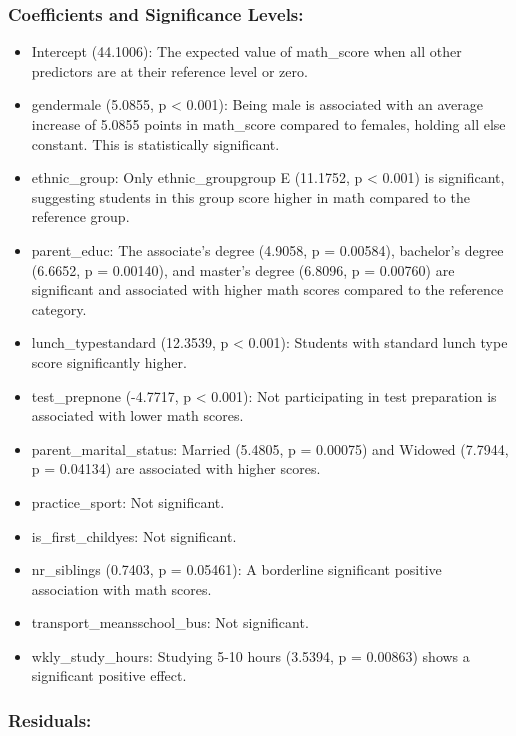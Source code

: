 \documentclass[
  12pt,
]{article}
\providecommand{\tightlist}{%
  \setlength{\itemsep}{0pt}\setlength{\parskip}{0pt}}
\begin{document}
\hypertarget{coefficients-and-significance-levels}{%
\subsubsection{Coefficients and Significance
Levels:}\label{coefficients-and-significance-levels}}

\begin{itemize}
\tightlist
\item
  Intercept (44.1006): The expected value of math\_score when all other
  predictors are at their reference level or zero.
\item
  gendermale (5.0855, p \textless{} 0.001): Being male is associated
  with an average increase of 5.0855 points in math\_score compared to
  females, holding all else constant. This is statistically significant.
\item
  ethnic\_group: Only ethnic\_groupgroup E (11.1752, p \textless{}
  0.001) is significant, suggesting students in this group score higher
  in math compared to the reference group.
\item
  parent\_educ: The associate's degree (4.9058, p = 0.00584), bachelor's
  degree (6.6652, p = 0.00140), and master's degree (6.8096, p =
  0.00760) are significant and associated with higher math scores
  compared to the reference category.
\item
  lunch\_typestandard (12.3539, p \textless{} 0.001): Students with
  standard lunch type score significantly higher.
\item
  test\_prepnone (-4.7717, p \textless{} 0.001): Not participating in
  test preparation is associated with lower math scores.
\item
  parent\_marital\_status: Married (5.4805, p = 0.00075) and Widowed
  (7.7944, p = 0.04134) are associated with higher scores.
\item
  practice\_sport: Not significant.
\item
  is\_first\_childyes: Not significant.
\item
  nr\_siblings (0.7403, p = 0.05461): A borderline significant positive
  association with math scores.
\item
  transport\_meansschool\_bus: Not significant.
\item
  wkly\_study\_hours: Studying 5-10 hours (3.5394, p = 0.00863) shows a
  significant positive effect.
\end{itemize}

\hypertarget{residuals}{%
\subsubsection{Residuals:}\label{residuals}}
\end{document}

